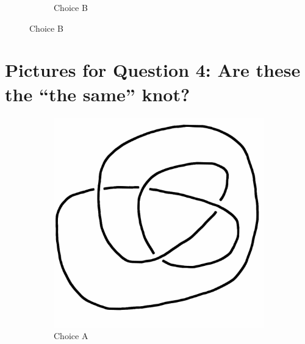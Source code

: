\documentclass[12pt,letterpaper]{article}
\theoremstyle{definition}
\begin{document}
\begin{figure}[h!]
\begin{subfigure}[b]{0.4\textwidth}
        \caption{Choice B}
    \end{subfigure}
\end{figure}

\section*{Pictures for Question 4: Are these the ``the same'' knot?}

\begin{figure}[h!]
    \begin{subfigure}[b]{0.4\textwidth}
        \includegraphics[width=\textwidth]{meeting06pics/9SeptQ4a.png}
        \caption{Choice A}
    \end{subfigure}
    \hspace{2cm}
    \begin{subfigure}[b]{0.4\textwidth}

\end{subfigure}
\end{figure}
\end{document}
